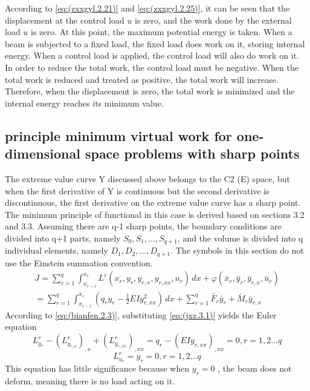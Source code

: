 According to \ref{eq:(zxxgyl.2.21)} and \ref{eq:(zxxgyl.2.25)}, it can be seen that the displacement at the control load $ u $ is zero, and the work done by the external load $ u $ is zero. At this point, the maximum potential energy is taken. When a beam is subjected to a fixed load, the fixed load does work on it, storing internal energy. When a control load is applied, the control load will also do work on it. In order to reduce the total work, the control load must be negative. When the total work is reduced and treated as positive, the total work will increase. Therefore, when the displacement is zero, the total work is minimized and the internal energy reaches its minimum value.

\subsection {principle minimum virtual work for one-dimensional space problems with sharp points}
The extreme value curve Y discussed above belongs to the C2 (E) space, but when the first derivative of Y is continuous but the second derivative is discontinuous, the first derivative on the extreme value curve has a sharp point. The minimum principle of functional in this case is derived based on sections 3.2 and 3.3. Assuming there are q-1 sharp points, the boundary conditions are divided into q+1 parts, namely $S_0, S_1,..., S_{q+1}$, and the volume is divided into q individual elements, namely $D_1, D_2,..., D_{q+1}$. The symbols in this section do not use the Einstein summation convention.
\begin{multline}\label{eq:(zxxgyl.3.1)}
J = \sum_{r=1}^{q}\int_{x_{r-1}}^{x_{r}} L^{r}(x_r,y_r,y_{r,x},y_{r,xx},u_r)\,dx+\varphi(\bar {x}_ {r},\bar {y}_ {r},\bar {y}_ {r,x},\bar {u}_ {r})
\\=\sum_{r=1}^{q}\int_{x_{r-1}}^{x_{r}} (q_r y_r-\frac{1} {2}EIy_ {r,xx}^2)\,dx+\sum_{r=1}^{q}\bar {F}_r \bar {y}_ {r}+\bar {M}_r \bar {y}_ {r,x}
\end{multline}
According to \ref{eq:(bianfen.2.3)}, substituting \ref{eq:(jxz.3.1)} yields the Euler equation
\begin{equation} \label{eq:(zxxgyl.3.2)}    
L^ {r}_ {y_{r}} - 
\left(L^ {r}_ {y_{r,x}}\right)_{,x}+\left(L^ {r}_ {y_{r,xx}}\right)_{,xx}=q_r-(EIy_{r,xx})_{,xx}
=0,r=1,2...q
\end{equation}
\begin{equation} \label{eq:(zxxgyl.3.3)}    
L^ {r}_ {u_r}=y_r=0,r=1,2...q
\end{equation}
This equation has little significance because when $ y_r=0 $ , the beam does not deform, meaning there is no load acting on it.

